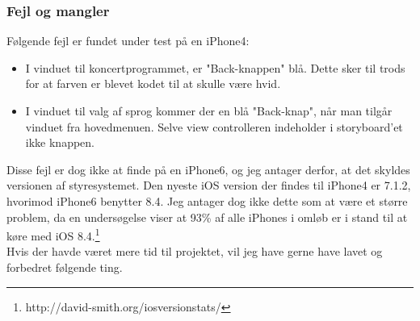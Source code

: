 \documentclass[a4paper,10pt,titlepage]{article}
\begin{document}
\subsubsection{Fejl og mangler}
Følgende fejl er fundet under test på en iPhone4:
\begin{itemize}
\item
I vinduet til koncertprogrammet, er "Back-knappen" blå. Dette sker til trods for at farven er blevet kodet til at skulle være hvid. 
\item
I vinduet til valg af sprog kommer der en blå "Back-knap", når man tilgår vinduet fra hovedmenuen. Selve view controlleren indeholder i storyboard'et ikke knappen.
\end{itemize}
Disse fejl er dog ikke at finde på en iPhone6, og jeg antager derfor, at det skyldes versionen af styresystemet. Den nyeste iOS version der findes til iPhone4 er 7.1.2, hvorimod iPhone6 benytter 8.4. Jeg antager dog ikke dette som at være et større problem, da  en undersøgelse viser at 93\% af alle iPhones i omløb er i stand til at køre med iOS 8.4.\footnote{http://david-smith.org/iosversionstats/}\\
Hvis der havde været mere tid til projektet, vil jeg have gerne have lavet og forbedret følgende ting.
\end{document}

